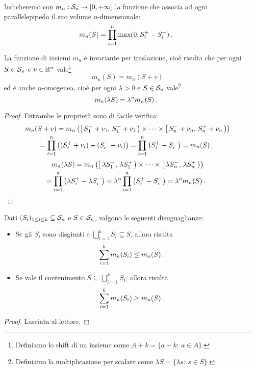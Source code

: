 \begin{definition}\label{def:LebesgueElementare}
	Indicheremo con $m_n:\S_n\to\Rpiu$ la funzione che associa ad ogni parallelepipedo il suo volume $n$-dimensionale:
	\begin{equation*}
		m_n(S)=\prod_{i=1}^n\max(0,S^+_i-S^-_i) \punto
	\end{equation*}
\end{definition}
\begin{remark}\label{nota:LebesgueElementareProprieta}
	La funzione di insiemi $m_n$ è invariante per traslazione, cioè risulta che per ogni $S\in\S_n$ e $v\in\R^n$ vale\footnote{Definiamo lo shift di un insieme come $A+k=\{a+k:\ a\in A\}$.}
	\begin{equation*}
		m_n(S)=m_n(S+v)
	\end{equation*}
	ed è anche $n$-omogenea, cioè per ogni $\lambda>0$ e $S\in\S_n$ vale\footnote{Definiamo la moltiplicazione per scalare come $\lambda S=\{\lambda s:\ s\in S\}$.}
	\begin{equation*}
		m_n(\lambda S)=\lambda^n m_n(S)\punto
	\end{equation*}
\end{remark}
\begin{proof}
	Entrambe le proprietà sono di facile verifica:
	\begin{multline*}
		m_n(S+v)=m_n\left(\co{S^-_1+v_1}{S^+_1+v_1}\times\cdots\times\co{S^-_n+v_n}{S^+_n+v_n}\right)\\
		=\prod_{i=1}^n\left((S^+_i+v_i)-(S^-_i+v_i)\right)=\prod_{i=1}^n\left(S^+_i-S^-_i\right)=m_n(S)\virgola
	\end{multline*}
	\begin{multline*}
		m_n(\lambda S)=m_n\left(\co{\lambda S^-_1}{\lambda S^+_1}\times\cdots\times\co{\lambda S^-_n}{\lambda S^+_n}\right)\\
		=\prod_{i=1}^n\left(\lambda S^+_i-\lambda S^-_i\right)=\lambda^n\prod_{i=1}^n\left(S^+_i-S^-_i\right)=\lambda^n m_n(S)\punto
	\end{multline*}
\end{proof}


\begin{lemma}\label{lemma:LebesgueElementareFinita}
	Dati $(S_i)_{1\le i\le k}\subseteq \S_n$ e $S\in\S_n$, valgono le seguenti disuguaglianze:
	\begin{itemize}
		\item Se gli $S_i$ sono disgiunti e $\bigsqcup_{i=1}^k S_i\subseteq S$, allora risulta
		\begin{equation*}
			\sum_{i=1}^k m_n(S_i)\le m_n(S)\punto
		\end{equation*}
		\item Se vale il contenimento $S\subseteq\bigcup_{i=1}^k S_i$, allora risulta
		\begin{equation*}
			\sum_{i=1}^k m_n(S_i)\ge m_n(S)\punto
		\end{equation*}
	\end{itemize}
\end{lemma}
\begin{proof}
	Lasciata al lettore.
\end{proof}

